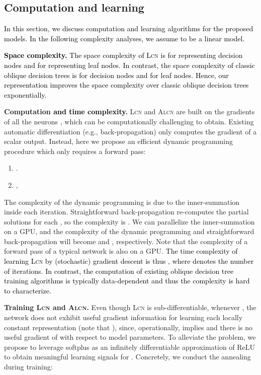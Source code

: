 \documentclass{article} \usepackage{iclr2020_conference,times}
\newcommand{\camera}[1]{\textcolor{black}{#1}}
\begin{document}
\subsection{Computation and learning}\label{sec:learning}
\vspace{-1mm}
\camera{In this section, we discuss computation and learning algorithms for the proposed models. In the following complexity analyses, we assume  to be a linear model.}

\camera{\textbf{Space complexity.} The space complexity of \textsc{Lcn} is  for representing decision nodes and  for representing leaf nodes. In contrast, the space complexity of classic oblique decision trees is  for decision nodes and  for leaf nodes. Hence, our representation improves the space complexity over classic oblique decision trees exponentially.}

\textbf{Computation \camera{and time complexity}.}
\textsc{Lcn} and \textsc{Alcn} are built on the gradients of all the neurons  , which can be computationally challenging to obtain. Existing automatic differentiation (e.g., back-propagation) only computes the gradient of a scalar output. Instead, here we propose an efficient dynamic programming procedure which only requires a forward pass:
\begin{enumerate}
\vspace{-2mm}
    \item .
\vspace{-1mm}
    \item ,
\vspace{-2.5mm}
\end{enumerate}
The complexity of the dynamic programming is  due to the inner-summation inside each iteration. Straightforward back-propagation re-computes the partial solutions  for each , so the complexity is . We can parallelize the inner-summation on a GPU, and the complexity of the dynamic programming and straightforward back-propagation will become  and , respectively. Note that the complexity of a forward pass of a typical network is also  on a GPU. \camera{The time complexity of learning \textsc{Lcn} by (stochastic) gradient descent is thus , where  denotes the number of iterations. In contrast, the computation of existing oblique decision tree training algorithms is typically data-dependent and thus the complexity is hard to characterize.} 


\textbf{Training \textsc{Lcn} and \textsc{Alcn}.} Even though \textsc{Lcn} is sub-differentiable, whenever , the network does not exhibit useful gradient information for learning each locally constant representation  (note that ), since, operationally,  implies  and there is no useful gradient of  with respect to model parameters. To alleviate the problem, we propose to leverage softplus as an infinitely differentiable approximation of ReLU to obtain meaningful learning signals for . Concretely, we conduct the annealing during training:
\end{document}

